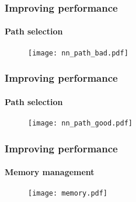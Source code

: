 \begin{frame}
  \frametitle{Improving performance}
  \framesubtitle{Path selection}

  \begin{figure}
    \centering
    \texttt{[image: nn\_path\_bad.pdf]}
  \end{figure}

\end{frame}

\begin{frame}
  \frametitle{Improving performance}
  \framesubtitle{Path selection}

  \begin{figure}
    \centering
    \texttt{[image: nn\_path\_good.pdf]}
  \end{figure}

\end{frame}

%
%

\begin{frame}
  \frametitle{Improving performance}
  \framesubtitle{Memory management}

  \begin{figure}
    \centering
    \texttt{[image: memory.pdf]}
  \end{figure}

\end{frame}
